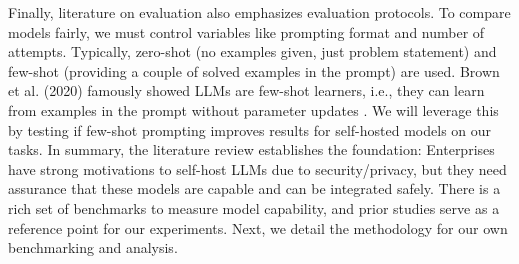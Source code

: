 Finally, literature on evaluation also emphasizes evaluation protocols. To compare models fairly, we must control variables like prompting format and number of attempts. Typically, zero-shot (no examples given, just problem statement) and few-shot (providing a couple of solved examples in the prompt) are used. Brown et al. (2020) famously showed LLMs are few-shot learners, i.e., they can learn from examples in the prompt without parameter updates \autocite{Brown2020}. We will leverage this by testing if few-shot prompting improves results for self-hosted models on our tasks.
In summary, the literature review establishes the foundation: Enterprises have strong motivations to self-host LLMs due to security/privacy, but they need assurance that these models are capable and can be integrated safely. There is a rich set of benchmarks to measure model capability, and prior studies serve as a reference point for our experiments. Next, we detail the methodology for our own benchmarking and analysis.